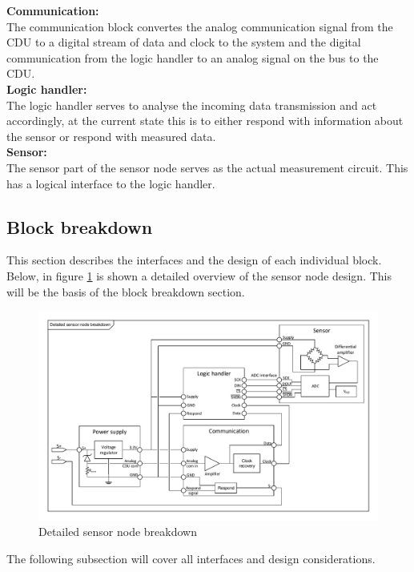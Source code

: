 \textbf{Communication:}\\
The communication block convertes the analog communication signal from the CDU to a digital stream of data and clock to the system and the digital communication from the logic handler to an analog signal on the bus to the CDU.\\

\textbf{Logic handler:}\\
The logic handler serves to analyse the incoming data transmission and act accordingly, at the current state this is to either respond with information about the sensor or respond with measured data.\\

\textbf{Sensor:}\\
The sensor part of the sensor node serves as the actual measurement circuit. This has a logical interface to the logic handler.\\

\subsection{Block breakdown}
This section describes the interfaces and the design of each individual block.\\
Below, in figure \ref{fig:SN_detailed} is shown a detailed overview of the sensor node design. This will be the basis of the block breakdown section.

\begin{figure}[H]
	\centering
	\includegraphics[width=1\textwidth]{billeder/SN_detailed_design}
	\caption{Detailed sensor node breakdown}
	\label{fig:SN_detailed}
\end{figure}

The following subsection will cover all interfaces and design considerations.

